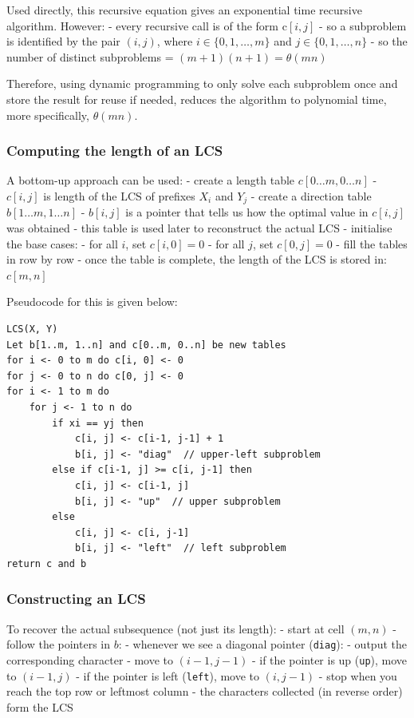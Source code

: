 \documentclass[11pt]{article}
\begin{document}
Used directly, this recursive equation gives an exponential time
recursive algorithm. However: - every recursive call is of the form
\(\text{c}[i,j]\) - so a subproblem is identified by the pair \((i,j)\),
where \(i \in \{0, 1, \ldots, m\}\) and \(j \in \{0, 1, \ldots, n\}\) -
so the number of distinct subproblems = \((m+1)(n+1) = \theta(mn)\)

Therefore, using dynamic programming to only solve each subproblem once
and store the result for reuse if needed, reduces the algorithm to
polynomial time, more specifically, \(\theta(mn)\).

    \subsubsection{Computing the length of an
LCS}\label{computing-the-length-of-an-lcs}

A bottom-up approach can be used: - create a length table
\(c[0 \ldots m, 0 \ldots n]\) - \(c[i,j]\) is length of the LCS of
prefixes \(X_i\) and \(Y_j\) - create a direction table
\(b[1 \ldots m, 1 \ldots n]\) - \(b[i,j]\) is a pointer that tells us
how the optimal value in \(c[i, j]\) was obtained - this table is used
later to reconstruct the actual LCS - initialise the base cases: - for
all \(i\), set \(c[i, 0] = 0\) - for all \(j\), set \(c[0, j] = 0\) -
fill the tables in row by row - once the table is complete, the length
of the LCS is stored in: \(c[m,n]\)

Pseudocode for this is given below:

\begin{verbatim}
LCS(X, Y)
Let b[1..m, 1..n] and c[0..m, 0..n] be new tables
for i <- 0 to m do c[i, 0] <- 0
for j <- 0 to n do c[0, j] <- 0
for i <- 1 to m do
    for j <- 1 to n do
        if xi == yj then
            c[i, j] <- c[i-1, j-1] + 1
            b[i, j] <- "diag"  // upper-left subproblem
        else if c[i-1, j] >= c[i, j-1] then
            c[i, j] <- c[i-1, j]
            b[i, j] <- "up"  // upper subproblem
        else
            c[i, j] <- c[i, j-1]
            b[i, j] <- "left"  // left subproblem
return c and b
\end{verbatim}

\subsubsection{Constructing an LCS}\label{constructing-an-lcs}

To recover the actual subsequence (not just its length): - start at cell
\((m, n)\) - follow the pointers in \(b\): - whenever we see a diagonal
pointer (\texttt{diag}): - output the corresponding character - move to
\((i-1, j-1)\) - if the pointer is up (\texttt{up}), move to
\((i-1, j)\) - if the pointer is left (\texttt{left}), move to
\((i, j-1)\) - stop when you reach the top row or leftmost column - the
characters collected (in reverse order) form the LCS
\end{document}

